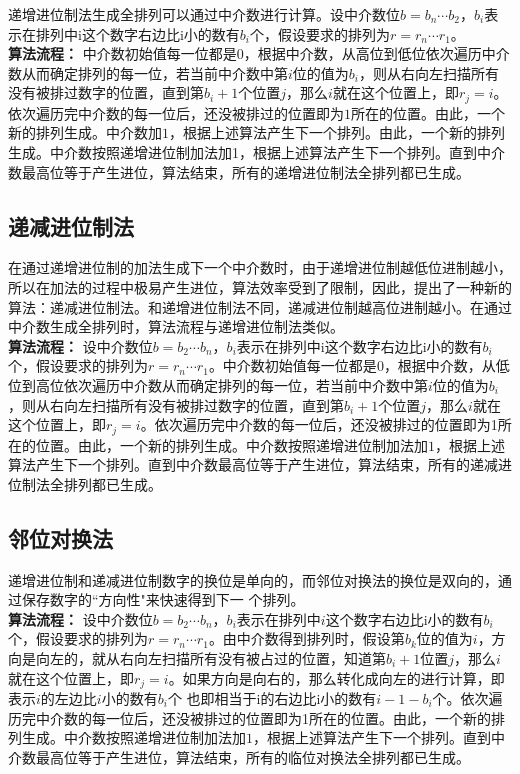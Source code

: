 \documentclass[10pt, twocolumn]{ctexart}
\begin{document}
递增进位制法生成全排列可以通过中介数进行计算。设中介数位$b = b_n\cdots b_{2}$，$b_i$表示在排列中i这个数字右边比i小的数有$b_i$个，假设要求的排列为$r= r_n\cdots r_1$。\\
\textbf{算法流程：}
中介数初始值每一位都是$0$，根据中介数，从高位到低位依次遍历中介数从而确定排列的每一位，若当前中介数中第$i$位的值为$b_i$，则从右向左扫描所有没有被排过数字的位置，直到第$b_i+1$个位置$j$，那么$i$就在这个位置上，即$r_j=i$。依次遍历完中介数的每一位后，还没被排过的位置即为$1$所在的位置。由此，一个新的排列生成。中介数加$1$，根据上述算法产生下一个排列。由此，一个新的排列生成。中介数按照递增进位制加法加1，根据上述算法产生下一个排列。直到中介数最高位等于产生进位，算法结束，所有的递增进位制法全排列都已生成。
\subsection{递减进位制法}
在通过递增进位制的加法生成下一个中介数时，由于递增进位制越低位进制越小，所以在加法的过程中极易产生进位，算法效率受到了限制，因此，提出了一种新的算法：递减进位制法。和递增进位制法不同，递减进位制越高位进制越小。在通过中介数生成全排列时，算法流程与递增进位制法类似。\\
\textbf{算法流程：}
设中介数位$b = b_2\cdots b_{n}$，$b_i$表示在排列中i这个数字右边比i小的数有$b_i$个，假设要求的排列为$r= r_n\cdots r_1$。中介数初始值每一位都是$0$，根据中介数，从低位到高位依次遍历中介数从而确定排列的每一位，若当前中介数中第$i$位的值为$b_i$，则从右向左扫描所有没有被排过数字的位置，直到第$b_i+1$个位置$j$，那么$i$就在这个位置上，即$r_j=i$。依次遍历完中介数的每一位后，还没被排过的位置即为1所在的位置。由此，一个新的排列生成。中介数按照递增进位制加法加$1$，根据上述算法产生下一个排列。直到中介数最高位等于产生进位，算法结束，所有的递减进位制法全排列都已生成。
\subsection{邻位对换法}
递增进位制和递减进位制数字的换位是单向的，而邻位对换法的换位是双向的，通过保存数字的``方向性"来快速得到下一 个排列。\\
\textbf{算法流程：}
设中介数位$b = b_2\cdots b_{n}$，$b_i$表示在排列中$i$这个数字右边比i小的数有$b_i$个，假设要求的排列为$r= r_n\cdots r_1$。由中介数得到排列时，假设第$b_k$位的值为$i$，方向是向左的，就从右向左扫描所有没有被占过的位置，知道第$b_i+1$位置$j$，那么$i$就在这个位置上，即$r_j=i$。如果方向是向右的，那么转化成向左的进行计算，即表示$i$的左边比$i$小的数有$b_i$个 也即相当于i的右边比i小的数有$i-1-b_i$个。依次遍历完中介数的每一位后，还没被排过的位置即为1所在的位置。由此，一个新的排列生成。中介数按照递增进位制加法加$1$，根据上述算法产生下一个排列。直到中介数最高位等于产生进位，算法结束，所有的临位对换法全排列都已生成。
\end{document}
